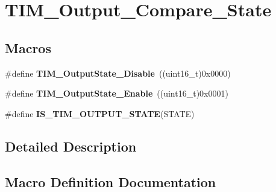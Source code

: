 \hypertarget{group___t_i_m___output___compare___state}{}\section{T\+I\+M\+\_\+\+Output\+\_\+\+Compare\+\_\+\+State}
\label{group___t_i_m___output___compare___state}
\subsection*{Macros}
\begin{DoxyCompactItemize}
\item 
\#define {\bfseries T\+I\+M\+\_\+\+Output\+State\+\_\+\+Disable}~((uint16\+\_\+t)0x0000)\hypertarget{group___t_i_m___output___compare___state_ga4ad0f484cfa16b5190654da8278940d0}{}\label{group___t_i_m___output___compare___state_ga4ad0f484cfa16b5190654da8278940d0}

\item 
\#define {\bfseries T\+I\+M\+\_\+\+Output\+State\+\_\+\+Enable}~((uint16\+\_\+t)0x0001)\hypertarget{group___t_i_m___output___compare___state_ga65afdda8761b6ac5ed0c0ad67c05dffe}{}\label{group___t_i_m___output___compare___state_ga65afdda8761b6ac5ed0c0ad67c05dffe}

\item 
\#define {\bfseries I\+S\+\_\+\+T\+I\+M\+\_\+\+O\+U\+T\+P\+U\+T\+\_\+\+S\+T\+A\+TE}(S\+T\+A\+TE)
\end{DoxyCompactItemize}


\subsection{Detailed Description}


\subsection{Macro Definition Documentation}
